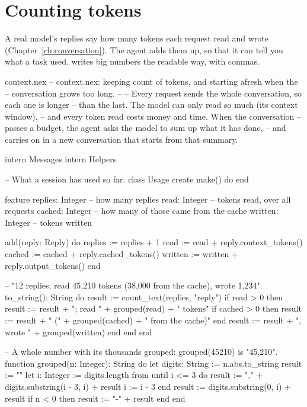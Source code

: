 \section{Counting tokens}

A real model's replies say how many tokens each request read and wrote
(Chapter~\ref{ch:conversation}). The agent adds them up, so that it can
tell you what a task used.  writes big numbers the readable
way, with commas.

\begin{newfile}{context.nex}
-- context.nex: keeping count of tokens, and starting afresh when the
-- conversation grows too long.
--
-- Every request sends the whole conversation, so each one is longer
-- than the last. The model can only read so much (its context window),
-- and every token read costs money and time. When the conversation
-- passes a budget, the agent asks the model to sum up what it has done,
-- and carries on in a new conversation that starts from that summary.

intern Messages
intern Helpers

-- What a session has used so far.
class Usage
create
  make() do
  end

feature
  replies: Integer        -- how many replies
  read: Integer           -- tokens read, over all requests
  cached: Integer         -- how many of those came from the cache
  written: Integer        -- tokens written

  add(reply: Reply) do
    replies := replies + 1
    read := read + reply.context_tokens()
    cached := cached + reply.cached_tokens()
    written := written + reply.output_tokens()
  end

  -- "12 replies; read 45,210 tokens (38,000 from the cache), wrote 1,234".
  to_string(): String do
    result := count_text(replies, "reply")
    if read > 0 then
      result := result + "; read " + grouped(read) + " tokens"
      if cached > 0 then
        result := result + " (" + grouped(cached) + " from the cache)"
      end
      result := result + ", wrote " + grouped(written)
    end
  end
end

-- A whole number with its thousands grouped: grouped(45210) is "45,210".
function grouped(n: Integer): String do
  let digits: String := n.abs.to_string
  result := ""
  let i: Integer := digits.length
  from until i <= 3 do
    result := "," + digits.substring(i - 3, i) + result
    i := i - 3
  end
  result := digits.substring(0, i) + result
  if n < 0 then
    result := "-" + result
  end
end
\end{newfile}

